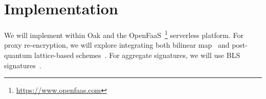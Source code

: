 \section{Implementation}

%
We will implement \SystemName within Oak and the
OpenFaaS~\footnote{\url{https://www.openfaas.com}} serverless platform.
%
For proxy re-encryption, we will explore integrating both bilinear
map~\cite{ 05-ndss-improved_proxy_reencryption} and post-quantum
lattice-based schemes~\cite{17-tops-fast_proxy_re_encryption}.
%
For aggregate signatures, we will use BLS
signatures~\cite{03-eurocrypt-aggregate_signatures_bilinear_maps,
03-pkc-threshold_multi_blind_signatures}.





